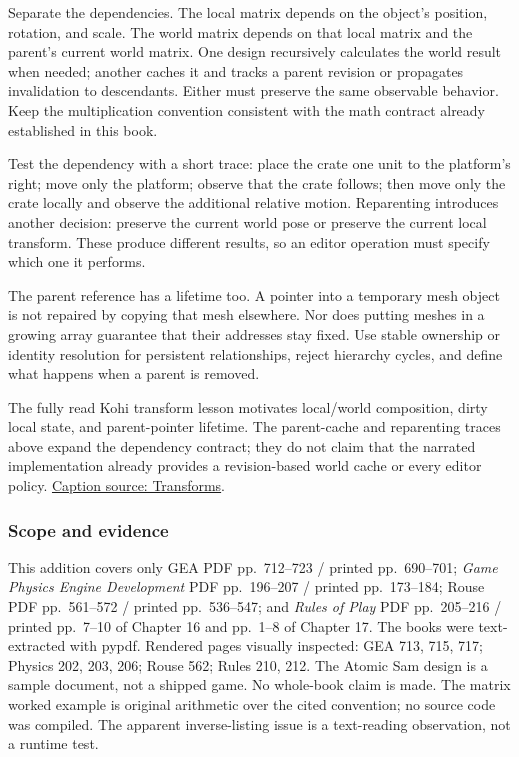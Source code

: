 Separate the dependencies. The local matrix depends on the object's position, rotation, and scale. The world matrix depends on that local matrix and the parent's current world matrix. One design recursively calculates the world result when needed; another caches it and tracks a parent revision or propagates invalidation to descendants. Either must preserve the same observable behavior. Keep the multiplication convention consistent with the math contract already established in this book.

Test the dependency with a short trace: place the crate one unit to the platform's right; move only the platform; observe that the crate follows; then move only the crate locally and observe the additional relative motion. Reparenting introduces another decision: preserve the current world pose or preserve the current local transform. These produce different results, so an editor operation must specify which one it performs.

The parent reference has a lifetime too. A pointer into a temporary mesh object is not repaired by copying that mesh elsewhere. Nor does putting meshes in a growing array guarantee that their addresses stay fixed. Use stable ownership or identity resolution for persistent relationships, reject hierarchy cycles, and define what happens when a parent is removed.

The fully read Kohi transform lesson motivates local/world composition, dirty local state, and parent-pointer lifetime. The parent-cache and reparenting traces above expand the dependency contract; they do not claim that the narrated implementation already provides a revision-based world cache or every editor policy. \href{https://www.youtube.com/watch?v=r2535XLneiI}{Caption source: Transforms}.

\subsubsection{Scope and evidence}\label{06-engine-ii-ch032-scope-and-evidence}

This addition covers only GEA PDF pp.~712--723 / printed pp.~690--701; \emph{Game Physics Engine Development} PDF pp.~196--207 / printed pp.~173--184; Rouse PDF pp.~561--572 / printed pp.~536--547; and \emph{Rules of Play} PDF pp.~205--216 / printed pp.~7--10 of Chapter 16 and pp.~1--8 of Chapter 17. The books were text-extracted with pypdf. Rendered pages visually inspected: GEA 713, 715, 717; Physics 202, 203, 206; Rouse 562; Rules 210, 212. The Atomic Sam design is a sample document, not a shipped game. No whole-book claim is made. The matrix worked example is original arithmetic over the cited convention; no source code was compiled. The apparent inverse-listing issue is a text-reading observation, not a runtime test.

